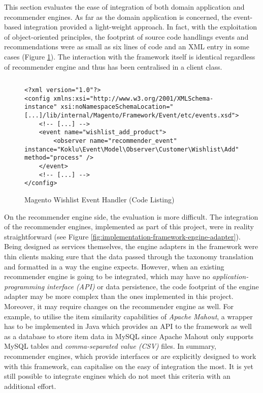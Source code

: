 This section evaluates the ease of integration of both domain application and recommender engines. As far as the domain application is concerned, the event-based integration provided a light-weight approach. In fact, with the exploitation of object-oriented principles, the footprint of source code handlings events and recommendations were as small as six lines of code and an XML entry in some cases (Figure \ref{fig:evaluation-framework-easy-magento}). The interaction with the framework itself is identical regardless of recommender engine and thus has been centralised in a client class.

\begin{figure}[ht]
    \inputminted{php}{./includes/source/demo/app/code/Koklu/Event/Model/Observer/Customer/Wishlist/Add.php}
    \begin{verbatim}
<?xml version="1.0"?>
<config xmlns:xsi="http://www.w3.org/2001/XMLSchema-instance" xsi:noNamespaceSchemaLocation="[...]/lib/internal/Magento/Framework/Event/etc/events.xsd">
    <!-- [...] -->
    <event name="wishlist_add_product">
        <observer name="recommender_event" instance="Koklu\Event\Model\Observer\Customer\Wishlist\Add" method="process" />
    </event>
    <!-- [...] -->
</config>

    \end{verbatim}
    \caption{Magento Wishlist Event Handler (Code Listing)}
    \label{fig:evaluation-framework-easy-magento}
\end{figure}

On the recommender engine side, the evaluation is more difficult. The integration of the recommender engines, implemented as part of this project, were in reality straightforward (see Figure \ref{fig:implementation-framework-engine-adapter}). Being designed as services themselves, the engine adapters in the framework were thin clients making sure that the data passed through the taxonomy translation and formatted in a way the engine expects. However, when an existing recommender engine is going to be integrated, which may have no \emph{application-programming interface (API)} or data persistence, the code footprint of the engine adapter may be more complex than the ones implemented in this project. Moreover, it may require changes on the recommender engine as well. For example, to utilise the item similarity capabilities of \emph{Apache Mahout}, a wrapper has to be implemented in Java which provides an API to the framework as well as a database to store item data in MySQL since Apache Mahout only supports MySQL tables and \emph{comma-separated value (CSV)} files. In summary, recommender engines, which provide interfaces or are explicitly designed to work with this framework, can capitalise on the easy of integration the most. It is yet still possible to integrate engines which do not meet this criteria with an additional effort.

